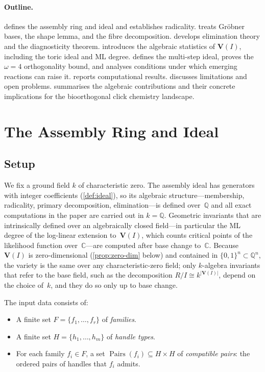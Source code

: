 \documentclass[preprint,12pt]{elsarticle}
\theoremstyle{definition}
\theoremstyle{remark}
\newcommand{\kk}{k}
\newcommand{\QQ}{\mathbb{Q}}
\newcommand{\CC}{\mathbb{C}}
\newcommand{\Var}{\mathbf{V}}
\DeclareMathOperator{\Pairs}{Pairs}
\begin{document}
\paragraph{Outline.}
 defines the assembly ring and ideal and
establishes radicality.
 treats Gr\"obner bases, the shape lemma,
and the fibre decomposition.
 develops elimination theory and the
diagnosticity theorem.
 introduces the algebraic statistics of
$\Var(I)$, including the toric ideal and ML degree.
 defines the multi-step ideal, proves
the $\omega = 4$ orthogonality bound, and analyses conditions under
which emerging reactions can raise it.
 reports computational results.
 discusses limitations and open problems.
 summarises the algebraic contributions
and their concrete implications for the bioorthogonal click chemistry
landscape.


\section{The Assembly Ring and Ideal}\label{sec:ring}

\subsection{Setup}

We fix a ground field $\kk$ of characteristic zero.  The
assembly ideal has generators with integer coefficients
(\cref{def:ideal}), so its algebraic structure---membership,
radicality, primary decomposition, elimination---is defined
over~$\QQ$ and all exact computations in the paper are carried
out in $\kk = \QQ$.  Geometric invariants that are intrinsically
defined over an algebraically closed field---in particular the
ML degree of the log-linear extension to~$\Var(I)$, which counts
critical points of the likelihood function over~$\CC$---are
computed after base change to~$\CC$.  Because $\Var(I)$ is
zero-dimensional (\cref{prop:zero-dim} below) and contained in
$\{0,1\}^n \subset \QQ^n$, the variety is the same over any
characteristic-zero field; only $\kk$-algebra invariants that
refer to the base field, such as the decomposition
$R/I \cong \kk^{|\Var(I)|}$, depend on the choice of~$\kk$, and
they do so only up to base change.

The input data consists of:

\begin{itemize}[nosep]
\item A finite set $F = \{f_1, \ldots, f_r\}$ of \emph{families}.
\item A finite set $H = \{h_1, \ldots, h_m\}$ of \emph{handle types}.
\item For each family $f_i \in F$, a set
  $\Pairs(f_i) \subseteq H \times H$ of \emph{compatible pairs}:
  the ordered pairs of handles that $f_i$ admits.
\end{itemize}
\end{document}
